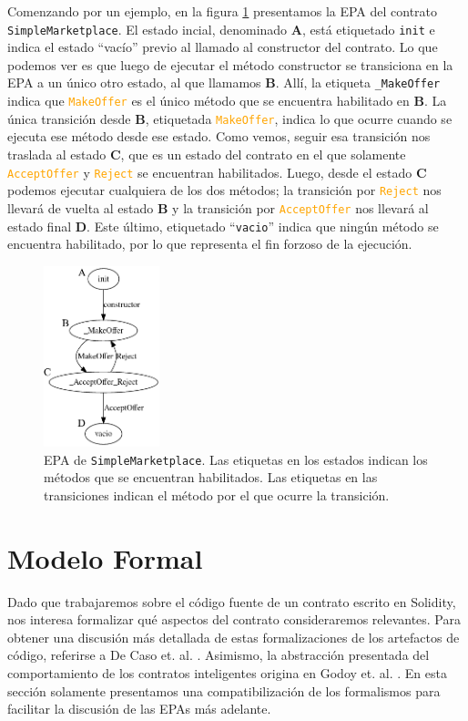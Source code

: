 Comenzando por un ejemplo, en la figura \ref{fig:epa-example} presentamos la EPA del contrato \texttt{Simple\-Marketplace}.
El estado incial, denominado \textbf{A}, está etiquetado \texttt{init} e indica el estado ``vacío'' previo al llamado al constructor del contrato.
Lo que podemos ver es que luego de ejecutar el método constructor se transiciona en la EPA a un único otro estado, al que llamamos \textbf{B}.
Allí, la etiqueta \texttt{\_MakeOffer} indica que \textcolor{orange}{\texttt{MakeOffer}} es el único método que se encuentra habilitado en \textbf{B}.
La única transición desde \textbf{B}, etiquetada \textcolor{orange}{\texttt{MakeOffer}}, indica lo que ocurre cuando se ejecuta ese método desde ese estado. Como vemos, seguir esa transición nos traslada  al estado \textbf{C}, que es un estado del contrato en el que solamente \textcolor{orange}{\texttt{AcceptOffer}} y \textcolor{orange}{\texttt{Reject}} se encuentran habilitados.
Luego, desde el estado \textbf{C} podemos ejecutar cualquiera de los dos métodos; la transición por \textcolor{orange}{\texttt{Reject}} nos llevará de vuelta al estado \textbf{B} y la transición por \textcolor{orange}{\texttt{AcceptOffer}} nos llevará al estado final \textbf{D}.
Este último, etiquetado ``\texttt{vacio}'' indica que ningún método se encuentra habilitado, por lo que representa el fin forzoso de la ejecución.



\begin{figure}
    \includegraphics[width=0.3\textwidth]{figs/simple-merketplace-epa.png}
    \caption{EPA de \texttt{SimpleMarketplace}. Las etiquetas en los estados indican los métodos que se encuentran habilitados. Las etiquetas en las transiciones indican el método por el que ocurre la transición.}
    \label{fig:epa-example}
\end{figure}

\section{Modelo Formal}
Dado que trabajaremos sobre el código fuente de un contrato escrito en Solidity, nos interesa formalizar qué aspectos del contrato consideraremos relevantes.
Para obtener una discusión más detallada de estas formalizaciones de los artefactos de código, referirse a De Caso et. al.  \cite{de-caso-epa}.
Asimismo, la abstracción presentada del comportamiento de los contratos inteligentes origina en Godoy et. al. \cite{predicate-abstraction-for-smart-contract-validation}.
En esta sección solamente presentamos una compatibilización de los formalismos para facilitar la discusión de las EPAs más adelante.

